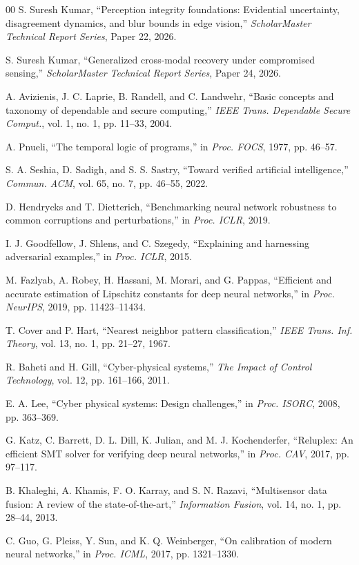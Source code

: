 \documentclass[conference]{IEEEtran}
\begin{document}
\begin{thebibliography}{00}
 S. Suresh Kumar, ``Perception integrity foundations: Evidential uncertainty, disagreement dynamics, and blur bounds in edge vision,'' \emph{ScholarMaster Technical Report Series}, Paper 22, 2026.

 S. Suresh Kumar, ``Generalized cross-modal recovery under compromised sensing,'' \emph{ScholarMaster Technical Report Series}, Paper 24, 2026.

 A. Avizienis, J. C. Laprie, B. Randell, and C. Landwehr, ``Basic concepts and taxonomy of dependable and secure computing,'' \emph{IEEE Trans. Dependable Secure Comput.}, vol. 1, no. 1, pp. 11--33, 2004.

 A. Pnueli, ``The temporal logic of programs,'' in \emph{Proc. FOCS}, 1977, pp. 46--57.

 S. A. Seshia, D. Sadigh, and S. S. Sastry, ``Toward verified artificial intelligence,'' \emph{Commun. ACM}, vol. 65, no. 7, pp. 46--55, 2022.

 D. Hendrycks and T. Dietterich, ``Benchmarking neural network robustness to common corruptions and perturbations,'' in \emph{Proc. ICLR}, 2019.

 I. J. Goodfellow, J. Shlens, and C. Szegedy, ``Explaining and harnessing adversarial examples,'' in \emph{Proc. ICLR}, 2015.

 M. Fazlyab, A. Robey, H. Hassani, M. Morari, and G. Pappas, ``Efficient and accurate estimation of Lipschitz constants for deep neural networks,'' in \emph{Proc. NeurIPS}, 2019, pp. 11423--11434.

 T. Cover and P. Hart, ``Nearest neighbor pattern classification,'' \emph{IEEE Trans. Inf. Theory}, vol. 13, no. 1, pp. 21--27, 1967.

 R. Baheti and H. Gill, ``Cyber-physical systems,'' \emph{The Impact of Control Technology}, vol. 12, pp. 161--166, 2011.

 E. A. Lee, ``Cyber physical systems: Design challenges,'' in \emph{Proc. ISORC}, 2008, pp. 363--369.

 G. Katz, C. Barrett, D. L. Dill, K. Julian, and M. J. Kochenderfer, ``Reluplex: An efficient SMT solver for verifying deep neural networks,'' in \emph{Proc. CAV}, 2017, pp. 97--117.

 B. Khaleghi, A. Khamis, F. O. Karray, and S. N. Razavi, ``Multisensor data fusion: A review of the state-of-the-art,'' \emph{Information Fusion}, vol. 14, no. 1, pp. 28--44, 2013.

 C. Guo, G. Pleiss, Y. Sun, and K. Q. Weinberger, ``On calibration of modern neural networks,'' in \emph{Proc. ICML}, 2017, pp. 1321--1330.

\end{thebibliography}
\end{document}
